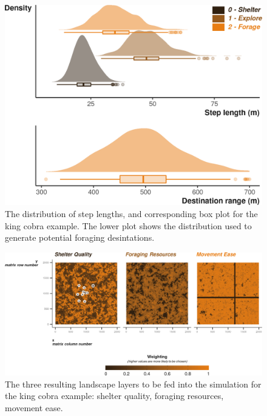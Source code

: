 \documentclass[10pt,a4paper]{article}
\begin{document}
\begin{figure}

{\centering \includegraphics{Agent-based_model_walkthrough_files/figure-latex/KINGCOBRAsettingMoveDesPlot-1} 

}

\caption{The distribution of step lengths, and corresponding box plot for the king cobra example. The lower plot shows the distribution used to generate potential foraging desintations.}\label{fig:KINGCOBRAsettingMoveDesPlot}
\end{figure}

\begin{figure}

{\centering \includegraphics{Agent-based_model_walkthrough_files/figure-latex/KINGCOBRAlayersFigure-1} 

}

\caption{The three resulting landscape layers to be fed into the simulation for the king cobra example: shelter quality, foraging resources, movement ease.}\label{fig:KINGCOBRAlayersFigure}
\end{figure}
\end{document}
